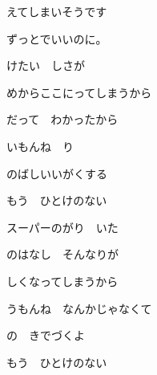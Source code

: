 \documentclass[a4paper,tate,twocolumn,12pt]{ltjtarticle}
\begin{document}
\thispagestyle{empty}

\begin{center}
{\LARGE {}えてしまいそうです}

{\large ずっとでいいのに。}
\end{center}

\vspace{1em}

\begin{flushleft}

\noindent\begin{minipage}{\linewidth}
けたい　しさが

めからここにってしまうから

だって　わかったから
\end{minipage}

\vspace{2em}

\noindent\begin{minipage}{\linewidth}
いもんね　り

のばしいいがくする

もう　ひとけのない
\end{minipage}

\vspace{2em}

\noindent\begin{minipage}{\linewidth}
スーパーのがり　いた

のはなし　そんなりが

しくなってしまうから
\end{minipage}

\vspace{2em}

\noindent\begin{minipage}{\linewidth}
うもんね　なんかじゃなくて

の　きでづくよ

もう　ひとけのない
\end{minipage}

\vspace{2em}


\end{flushleft}
\end{document}
